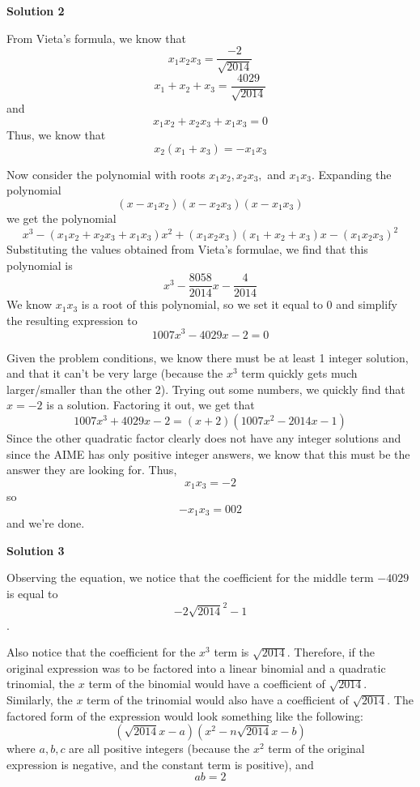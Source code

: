 \begin{enumerate}
 



\textbf{Solution 2}

From Vieta's formula, we know that 
 \[x_1x_2x_3 = \dfrac{-2}{\sqrt{2014}}\] 
 \[x_1 + x_2 + x_3 = \dfrac{4029}{\sqrt{2014}}\] and 
 \[x_1x_2 + x_2x_3 + x_1x_3 = 0\] Thus, we know that 
 \[x_2(x_1 + x_3) = -x_1x_3\]

 Now consider the polynomial with roots $x_1x_2, x_2x_3,$ and $x_1x_3$. Expanding the polynomial 
 \[(x - x_1x_2)(x - x_2x_3)(x - x_1x_3)\]we get the polynomial 
 \[x^3 - (x_1x_2 + x_2x_3 + x_1x_3)x^2 + (x_1x_2x_3)(x_1 + x_2 + x_3)x - (x_1x_2x_3)^2\] Substituting the values obtained from Vieta's formulae, we find that this polynomial is 
 \[x^3 - \dfrac{8058}{2014}x - \dfrac{4}{2014}\] We know $x_1x_3$ is a root of this polynomial, so we set it equal to 0 and simplify the resulting expression to 
 \[1007x^3 - 4029x - 2 = 0\]

 Given the problem conditions, we know there must be at least 1 integer solution, and that it can't be very large (because the $x^3$ term quickly gets much larger/smaller than the other 2). Trying out some numbers, we quickly find that $x = -2$ is a solution. Factoring it out, we get that 
 \[1007x^3 + 4029x - 2 = (x+2)(1007x^2 - 2014x - 1)\] Since the other quadratic factor clearly does not have any integer solutions and since the AIME has only positive integer answers, we know that this must be the answer they are looking for. Thus, 
 \[x_1x_3 = -2\] so 
 \[-x_1x_3 = \boxed{002}\]and we're done.

 



\textbf{Solution 3}

Observing the equation, we notice that the coefficient for the middle term $-4029$ is equal to 
 \[-2{\sqrt{2014}}^2-1\]. 

 Also notice that the coefficient for the ${x^3}$ term is $\sqrt{2014}$. Therefore, if the original expression was to be factored into a linear binomial and a quadratic trinomial, the $x$ term of the binomial would have a coefficient of $\sqrt{2014}$. Similarly, the $x$ term of the trinomial would also have a coefficient of $\sqrt{2014}$. The factored form of the expression would look something like the following:
 \[({\sqrt{2014}}x-a)(x^2-n{\sqrt{2014}}x-b)\] where ${a, b,c}$ are all positive integers (because the ${x^2}$ term of the original expression is negative, and the constant term is positive), and 
 \[{ab=2}\]


\end{enumerate}
